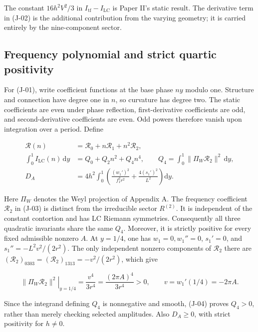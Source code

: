 The constant $16h^2V^2/3$ in $I_{\mathrm{tf}}-I_{\mathrm{LC}}$ is Paper II's
static result. The derivative term in (J-02) is the additional contribution
from the varying geometry; it is carried entirely by the nine-component sector.

\subsection{Frequency polynomial and strict quartic positivity}

For (J-01), write coefficient functions at the base phase $ny$ modulo one.
Structure and connection have degree one in $n$, so curvature has degree two.
The static coefficients are even under phase reflection, first-derivative
coefficients are odd, and second-derivative coefficients are even. Odd powers
therefore vanish upon integration over a period. Define

\begin{equation}\tag{J-03}\label{eq:J-03}
\begin{aligned}
\mathcal R(n)&=\mathcal R_0+n\mathcal R_1+n^2\mathcal R_2,\\
\int_0^1 I_{\mathrm{LC}}(n)\,\mathrm{d}y&=Q_0+Q_2n^2+Q_4n^4,
\qquad Q_4=\int_0^1\|\Pi_W\mathcal R_2\|^2\,\mathrm{d}y,\\
D_A&=4h^2\int_0^1\left(\frac{(w_1')^2}{f_1^2r^2}
+\frac{4(s_1')^2}{L^2}\right)\mathrm{d}y.
\end{aligned}
\end{equation}

Here $\Pi_W$ denotes the Weyl projection of Appendix A.
The frequency coefficient $\mathcal R_2$ in (J-03) is distinct from the
irreducible sector $R^{(2)}$. It is independent of the constant contortion and
has LC Riemann symmetries. Consequently all three quadratic invariants share
the same $Q_4$. Moreover, it is strictly positive for every fixed admissible
nonzero $A$. At $y=1/4$, one has $w_1=0,w_1''=0$, $s_1'=0$, and
$s_1''=-L^2v^2/(2r^2)$. The only independent nonzero components of
$\mathcal R_2$ there are
$(\mathcal R_2)_{0303}=(\mathcal R_2)_{1313}=-v^2/(2r^2)$,
which give

\begin{equation}\tag{J-04}\label{eq:J-04}
\left.\|\Pi_W\mathcal R_2\|^2\right|_{y=1/4}
=\frac{v^4}{3r^4}=\frac{(2\pi A)^4}{3r^4}>0,
\qquad v=w_1'(1/4)=-2\pi A.
\end{equation}

Since the integrand defining $Q_4$ is nonnegative and smooth, (J-04) proves
$Q_4>0$, rather than merely checking selected amplitudes. Also $D_A\ge0$,
with strict positivity for $h\ne0$.

